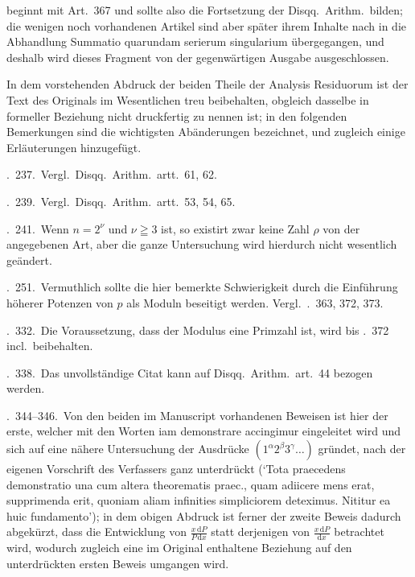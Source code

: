 %
beginnt mit Art.\ 367 und sollte also die Fortsetzung der Disqq.\ Arithm.\ bilden; die wenigen noch vorhandenen Artikel sind aber später ihrem Inhalte nach in die Abhandlung Summatio quarundam serierum singularium übergegangen, und deshalb wird dieses Fragment von der gegenwärtigen Ausgabe ausgeschlossen.

In dem vorstehenden Abdruck der beiden Theile der Analysis Residuorum ist der Text des Originals im Wesentlichen treu beibehalten, obgleich dasselbe in formeller Beziehung nicht druckfertig zu nennen ist; in den folgenden Bemerkungen sind die wichtigsten Abänderungen bezeichnet, und zugleich einige Erläuterungen hinzugefügt.

\textsection.\ 237.\ Vergl.\ Disqq.\ Arithm.\ artt.\ 61, 62.

\textsection.\ 239.\ Vergl.\ Disqq.\ Arithm.\ artt.\ 53, 54, 65.

\textsection.\ 241.\ Wenn $n=2^\nu$ und $\nu\geqq3$ ist, so existirt zwar keine Zahl $\rho$ von der angegebenen Art, aber die ganze Untersuchung wird hierdurch nicht wesentlich geändert.

\textsection.\ 251.\ Vermuthlich sollte die hier bemerkte Schwierigkeit durch die Einführung höherer Potenzen von $p$ als Moduln beseitigt werden. Vergl.\ \textsection\textsection.\ 363, 372, 373.

\textsection.\ 332.\ Die Voraussetzung, dass der Modulus eine Primzahl ist, wird bis \textsection.\ 372 incl.\ beibehalten.

\textsection.\ 338.\ Das unvollständige Citat kann auf Disqq.\ Arithm.\ art.\ 44 bezogen werden.

\textsection\textsection.\ 344--346.\ Von den beiden im Manuscript vorhandenen Beweisen ist hier der erste, welcher mit den Worten iam demonstrare accingimur eingeleitet wird und sich auf eine nähere Untersuchung der Ausdrücke $(1^\alpha2^\beta3^\gamma\ldots)$ gründet, nach der eigenen Vorschrift des Verfassers ganz unterdrückt (`Tota praecedens demonstratio una cum altera theorematis praec., quam adiicere mens erat, supprimenda erit, quoniam aliam infinities simpliciorem deteximus. Nititur ea huic fundamento'); in dem obigen Abdruck ist ferner der zweite Beweis dadurch abgekürzt, dass die Entwicklung von $\frac{x\,\mathrm{d}P}{P\,\mathrm{d}x}$ statt derjenigen von $\frac{x\,\mathrm{d}P}{\mathrm{d}x}$ betrachtet wird, wodurch zugleich eine im Original enthaltene Beziehung auf den unterdrückten ersten Beweis umgangen wird.

